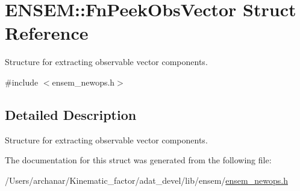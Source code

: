 \hypertarget{structENSEM_1_1FnPeekObsVector}{}\section{E\+N\+S\+EM\+:\+:Fn\+Peek\+Obs\+Vector Struct Reference}
\label{structENSEM_1_1FnPeekObsVector}


Structure for extracting observable vector components.  




{\ttfamily \#include $<$ensem\+\_\+newops.\+h$>$}



\subsection{Detailed Description}
Structure for extracting observable vector components. 

The documentation for this struct was generated from the following file\+:\begin{DoxyCompactItemize}
\item 
/\+Users/archanar/\+Kinematic\+\_\+factor/adat\+\_\+devel/lib/ensem/\mbox{\hyperlink{lib_2ensem_2ensem__newops_8h}{ensem\+\_\+newops.\+h}}\end{DoxyCompactItemize}
